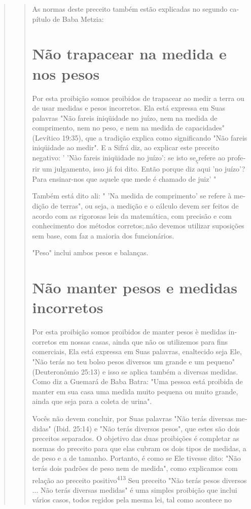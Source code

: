 \begin{quote}
\begin{quote}
As normas deste preceito também estão explicadas no segundo ca­pítulo de
Baba Metzia:

\section{Não trapacear na medida e nos pesos}

Por esta proibição somos proibidos de trapacear ao medir a terra ou de
usar medidas e pesos incorretos. Ela está expressa em Suas palavras "Não
fareis iniqüidade no juízo, nem na medida de comprimento, nem no peso, e
nem na medida de capacidades" (Levítico 19:35), que a tradição explica
como significando "Não fareis iniqüidade ao medir". E a Sifrá diz, ao
explicar este preceito negativo: ' 'Nào fareis iniqüidade no juízo': se
isto se\textsubscript{ç}refere ao profe­rir um julgamento, isso já foi
dito. Então porque diz aqui 'no juízo'? Para ensinar-nos que aquele que
mede é chamado de juiz' "

Também está dito ali: " 'Na medida de comprimento' se refere à me­dição
de terras", ou seja, a medição e o cálculo devem ser feitos de acordo
com as rigorosas leis da matemática, com precisão e com conhecimento dos
méto­dos corretos;.não devemos utilizar suposições sem base, com faz a
maioria dos funcionários.

"Peso" inclui ambos pesos e balanças.

\section{Não manter pesos e medidas incorretos}

Por esta proibição somos proibidos de manter pesos è medidas in­corretos
em nossas casas, ainda que não os utilizemos para fins comerciais, Ela
está expressa em Suas palavras, enaltecido seja Ele, "Não terás no teu
bolso pe­sos diversos um grande e um pequeno" (Deuteronômio 25:13) e
isso se aplica também a diversas medidas. Como diz a Guemará de Baba
Batra: "Uma pessoa está proibida de manter em sua casa uma medida muito
pequena ou muito gran­de, ainda que seja para a coleta de urina".

Vocês não devem concluir, por Suas palavras "Não terás diversas
me­didas" (Ibid. 25:14) e "Não terás diversos pesos", que estes são dois
preceitos separados. O objetivo das duas proibições é completar as
normas do preceito para que elas cubram os dois tipos de medidas, a de
peso e a de tamanho. Por­tanto, é como se Ele tivesse dito: "Não terás
dois padrões de peso nem de me­dida", como explicamos com relação ao
preceito positivo\textsuperscript{413} Seu preceito "Não terás pesos
diversos ... Não terás diversas medidas" é uma simples proibi­ção que
inclui vários casos, todos regidos pela mesma lei, tal como acontece no
\end{quote}


\end{quote}

